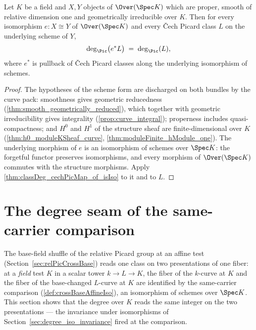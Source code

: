 \begin{theorem}
  \label{thm:classDeg_map_iso}
  \leanok
  Let \(K\) be a field and \(X, Y\) objects of \(\Over(\Spec K)\) which are proper,
  smooth of relative dimension one and geometrically irreducible over \(K\). Then for
  every isomorphism \(e : X \cong Y\) of \(\Over(\Spec K)\) and every \v Cech Picard
  class \(L\) on the underlying scheme of \(Y\),
  \[
    \deg_{\Pic}\bigl(e^{*}L\bigr) \;=\; \deg_{\Pic}(L),
  \]
  where \(e^{*}\) is pullback of \v Cech Picard classes along the underlying
  isomorphism of schemes.
\end{theorem}
\begin{proof}
  \leanok
  The hypotheses of the scheme form are discharged on both bundles by the curve pack:
  smoothness gives geometric reducedness (\ref{thm:smooth_geometrically_reduced}),
  which together with geometric irreducibility gives integrality
  (\ref{prop:curve_integral}); properness includes quasi-compactness; and \(H^0\) and
  \(H^1\) of the structure sheaf are finite-dimensional over \(K\)
  (\ref{thm:h0_moduleKSheaf_curve}, \ref{thm:moduleFinite_hModule_one}). The
  underlying morphism of \(e\) is an isomorphism of schemes over \(\Spec K\): the
  forgetful functor preserves isomorphisms, and every morphism of \(\Over(\Spec K)\)
  commutes with the structure morphisms. Apply
  \ref{thm:classDeg_cechPicMap_of_isIso} to it and to \(L\).
\end{proof}

\section{The degree seam of the same-carrier comparison}
\label{sec:degree_crossBase_seam}

The base-field shuffle of the relative Picard group at an affine test
(Section~\ref{sec:relPicCrossBase}) reads one class on two presentations of one fiber:
at a \emph{field} test \(K\) in a scalar tower \(k \to L \to K\), the fiber of the
\(k\)-curve at \(K\) and the fiber of the base-changed \(L\)-curve at \(K\) are
identified by the same-carrier comparison (\ref{def:crossBaseAffineIso}), an
isomorphism of schemes over \(\Spec K\). This section shows that the degree over
\(K\) reads the same integer on the two presentations --- the invariance under
isomorphisms of Section~\ref{sec:degree_iso_invariance} fired at the comparison.

